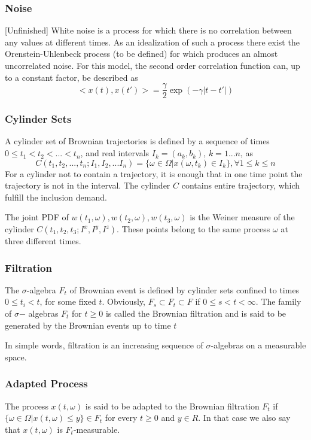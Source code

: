\documentclass[12pt]{report}
\begin{document}
\subsubsection{Noise}[Unfinished]
White noise is a process for which there is no correlation between any values at different times. As an idealization of such a process there exist the Orenstein-Uhlenbeck process (to be defined) for which produces an almost uncorrelated noise. For this model, the second order correlation function can, up to a constant factor, be described as 
\begin{equation*}
<x(t),x(t')>= \frac{\gamma}{2}\exp(-\gamma|t-t'|)
\end{equation*}

\subsubsection{Cylinder Sets}
A cylinder set of Brownian trajectories is defined by a sequence of times $0\leq t_1<t_2<...<t_n$, and real intervals $I_k=(a_k,b_k)$, $k=1...n$, as 
\begin{equation*}
C(t_1,t_2,...,t_n;I_1,I_2,...I_n)=\{\omega\in \Omega|x(\omega,t_k)\in I_k\},\forall 1\leq k \leq n
\end{equation*}
For a cylinder not to contain a trajectory, it is enough that in one time point the trajectory is not in the interval.
The cylinder $C$ contains entire trajectory, which fulfill the inclusion demand. 

The joint PDF of $w(t_1,\omega),w(t_2,\omega),w(t_3,\omega)$ is the Weiner measure of the cylinder $C(t_1,t_2,t_3;I^x,I^y,I^z)$. These points belong to the same process $\omega$ at three different times. 

\subsubsection{Filtration}
The $\sigma$-algebra $F_t$ of Brownian event is defined by cylinder
sets confined to times $0\leq t_i < t$, for some fixed $t$. Obviously, $F_s \subset F_t \subset F$ if $0\leq s < t <\infty$. The family of $\sigma$− algebras $F_t$ for $t \geq 0$ is called the Brownian filtration and is said to be generated by the Brownian events up to time $t$

In simple words, filtration is an increasing sequence of $\sigma$-algebras on a measurable space. 

\subsubsection{Adapted Process}
The process $x(t,\omega)$ is said to be adapted
to the Brownian filtration $F_t$ if $\{\omega\in\Omega|x(t,\omega) \leq y\} \in F_t$ for every $t \geq 0$ and
$y\in R$. In that case we also say that $x(t, \omega)$ is $F_t$-measurable.
\end{document}
